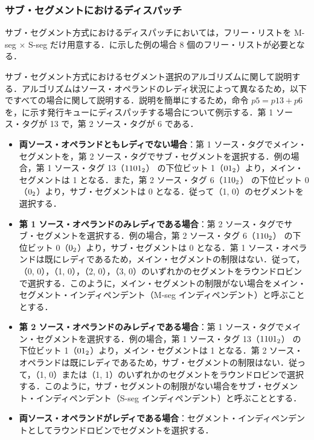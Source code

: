 \subsubsection{サブ・セグメントにおけるディスパッチ}
サブ・セグメント方式におけるディスパッチにおいては，フリー・リストを M-seg $\times$ S-seg だけ用意する．に示した例の場合 8 個のフリー・リストが必要となる．

サブ・セグメント方式におけるセグメント選択のアルゴリズムに関して説明する．アルゴリズムはソース・オペランドのレディ状況によって異なるため，以下ですべての場合に関して説明する．説明を簡単にするため，命令 $p5 = p13 + p6$ を，に示す発行キューにディスパッチする場合について例示する．第 1 ソース・タグが 13 で，第 2 ソース・タグが 6 である．
\begin{itemize}
  \item \textbf{両ソース・オペランドともレディでない場合}：第 1 ソース・タグでメイン・セグメントを，第 2 ソース・タグでサブ・セグメントを選択する．例の場合，第 1 ソース・タグ 13（${\rm 1101_2}$） の下位ビット 1（${\rm 01_2}$）より，メイン・セグメントは 1 となる．また，第 2 ソース・タグ 6（${\rm 110_2}$） の下位ビット 0（${\rm 0_2}$）より，サブ・セグメントは 0 となる．従って（1, 0）のセグメントを選択する． 
  \item \textbf{第 1 ソース・オペランドのみレディである場合}：第 2 ソース・タグでサブ・セグメントを選択する．例の場合，第 2 ソース・タグ 6（${\rm 110_2}$） の下位ビット 0（${\rm 0_2}$）より，サブ・セグメントは 0 となる．第 1 ソース・オペランドは既にレディであるため，メイン・セグメントの制限はない．従って，（0, 0），（1, 0），（2, 0），（3, 0）のいずれかのセグメントをラウンドロビンで選択する．このように，メイン・セグメントの制限がない場合をメイン・セグメント・インディペンデント（M-seg インディペンデント）と呼ぶこととする．
  \item \textbf{第 2 ソース・オペランドのみレディである場合}：第 1 ソース・タグでメイン・セグメントを選択する．例の場合，第 1 ソース・タグ 13（${\rm 1101_2}$） の下位ビット 1（${\rm 01_2}$）より，メイン・セグメントは 1 となる．第 2 ソース・オペランドは既にレディであるため，サブ・セグメントの制限はない．従って，（1, 0）または（1, 1）のいずれかのセグメントをラウンドロビンで選択する．このように，サブ・セグメントの制限がない場合をサブ・セグメント・インディペンデント（S-seg インディペンデント）と呼ぶこととする．
  \item \textbf{両ソース・オペランドがレディである場合}：セグメント・インディペンデントとしてラウンドロビンでセグメントを選択する．
\end{itemize}

